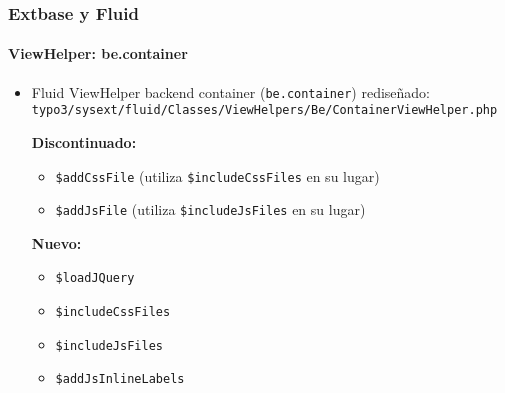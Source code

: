 
\begin{frame}[fragile]
	\frametitle{Extbase y Fluid}
	\framesubtitle{ViewHelper: be.container}

	\lstset{
		basicstyle=\smaller\ttfamily
	}

	\begin{itemize}
		\item Fluid ViewHelper backend container (\texttt{be.container}) rediseñado:\newline
			\smaller\texttt{typo3/sysext/fluid/Classes/ViewHelpers/Be/ContainerViewHelper.php}\normalsize\newline

			\smaller\textbf{Discontinuado:}\normalsize
			\begin{itemize}
				\item \texttt{\$addCssFile} (utiliza \texttt{\$includeCssFiles} en su lugar)
				\item \texttt{\$addJsFile} (utiliza \texttt{\$includeJsFiles} en su lugar)
			\end{itemize}

			\smaller\textbf{Nuevo:}\normalsize
			\begin{itemize}
				\item \texttt{\$loadJQuery}
				\item \texttt{\$includeCssFiles}
				\item \texttt{\$includeJsFiles}
				\item \texttt{\$addJsInlineLabels}
			\end{itemize}

	\end{itemize}

\end{frame}


